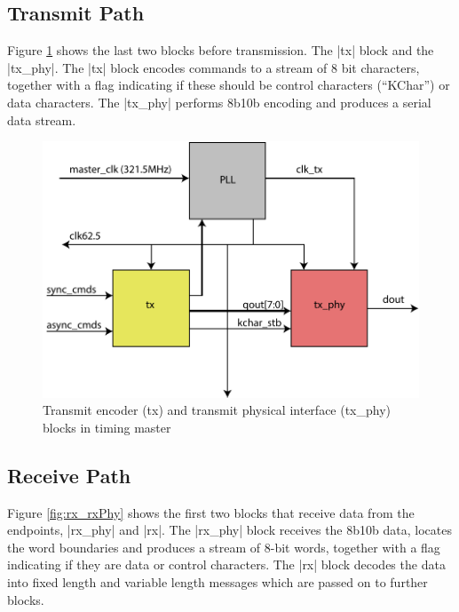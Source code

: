 \documentclass{dune}
\begin{document}
\subsection{Transmit Path}
Figure \ref{fig:tx_txPhy} shows the last two blocks before transmission. The |tx| block and the |tx_phy|. The |tx| block encodes commands to a stream of 8 bit characters, together with a flag indicating if these should be control characters (``KChar'') or data characters. The |tx_phy| performs 8b10b encoding and produces a serial data stream. 

\begin{figure}[h!]
    \centering
    \includegraphics{timing_system_tx_02-crop.pdf}
    \caption{Transmit encoder (tx) and transmit physical interface (tx\_phy) blocks in timing master}
    \label{fig:tx_txPhy}
\end{figure}

\subsection{Receive Path}

Figure \ref{fig:rx_rxPhy} shows the first two blocks that receive data from the endpoints, |rx_phy| and |rx|. The |rx_phy| block receives the 8b10b data, locates the word boundaries and produces a stream of 8-bit words, together with a flag indicating if they are data or control characters. The |rx| block decodes the data into fixed length and variable length messages which are passed on to further blocks.
\end{document}
